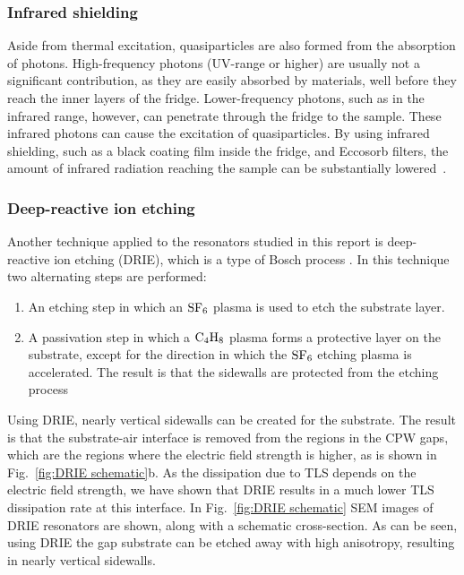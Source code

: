   \subsubsection{Infrared shielding}

  Aside from thermal excitation, quasiparticles are also formed from the absorption of photons. High-frequency photons (UV-range or higher) are usually not a significant contribution, as they are easily absorbed by materials, well before they reach the inner layers of the fridge. Lower-frequency photons, such as in the infrared range, however, can penetrate through the fridge to the sample. These infrared photons can cause the excitation of quasiparticles. By using infrared shielding, such as a black coating film inside the fridge, and Eccosorb filters, the amount of infrared radiation reaching the sample can be substantially lowered~\cite{barends2011minimizing}.



  \subsubsection{Deep-reactive ion etching}

  Another technique applied to the resonators studied in this report is deep-reactive ion etching (DRIE), which is a type of Bosch process \cite{bruno2015reducing}. In this technique two alternating steps are performed:

  \begin{enumerate}
      \item An etching step in which an $\mathrm{SF_6}$ plasma is used to etch the substrate layer.
      \item A passivation step in which a $\mathrm{C_4H_8}$ plasma forms a protective layer on the substrate, except for the direction in which the $\mathrm{SF_6}$ etching plasma is accelerated. The result is that the sidewalls are protected from the etching process
  \end{enumerate}

  Using DRIE, nearly vertical sidewalls can be created for the substrate. The result is that the substrate-air interface is removed from the regions in the CPW gaps, which are the regions where the electric field strength is higher, as is shown in Fig.~\ref{fig:DRIE schematic}b. As the dissipation due to TLS depends on the electric field strength, we have shown that DRIE results in a much lower TLS dissipation rate at this interface. In Fig.~\ref{fig:DRIE schematic} SEM images of DRIE resonators are shown, along with a schematic cross-section. As can be seen, using DRIE the gap substrate can be etched away with high anisotropy, resulting in nearly vertical sidewalls.

